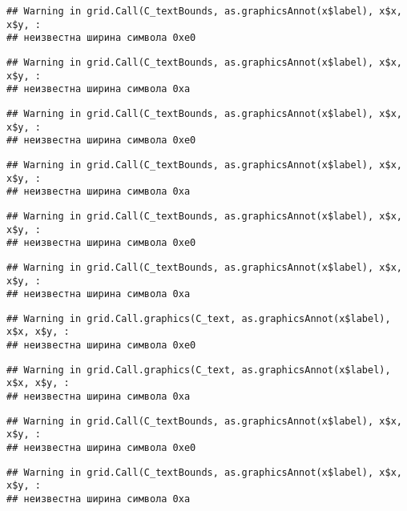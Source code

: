 \documentclass[
]{article}
\begin{document}
\begin{verbatim}
## Warning in grid.Call(C_textBounds, as.graphicsAnnot(x$label), x$x, x$y, :
## неизвестна ширина символа 0xe0
\end{verbatim}

\begin{verbatim}
## Warning in grid.Call(C_textBounds, as.graphicsAnnot(x$label), x$x, x$y, :
## неизвестна ширина символа 0xa
\end{verbatim}

\begin{verbatim}
## Warning in grid.Call(C_textBounds, as.graphicsAnnot(x$label), x$x, x$y, :
## неизвестна ширина символа 0xe0
\end{verbatim}

\begin{verbatim}
## Warning in grid.Call(C_textBounds, as.graphicsAnnot(x$label), x$x, x$y, :
## неизвестна ширина символа 0xa
\end{verbatim}

\begin{verbatim}
## Warning in grid.Call(C_textBounds, as.graphicsAnnot(x$label), x$x, x$y, :
## неизвестна ширина символа 0xe0
\end{verbatim}

\begin{verbatim}
## Warning in grid.Call(C_textBounds, as.graphicsAnnot(x$label), x$x, x$y, :
## неизвестна ширина символа 0xa
\end{verbatim}

\begin{verbatim}
## Warning in grid.Call.graphics(C_text, as.graphicsAnnot(x$label), x$x, x$y, :
## неизвестна ширина символа 0xe0
\end{verbatim}

\begin{verbatim}
## Warning in grid.Call.graphics(C_text, as.graphicsAnnot(x$label), x$x, x$y, :
## неизвестна ширина символа 0xa
\end{verbatim}

\begin{verbatim}
## Warning in grid.Call(C_textBounds, as.graphicsAnnot(x$label), x$x, x$y, :
## неизвестна ширина символа 0xe0
\end{verbatim}

\begin{verbatim}
## Warning in grid.Call(C_textBounds, as.graphicsAnnot(x$label), x$x, x$y, :
## неизвестна ширина символа 0xa
\end{verbatim}
\end{document}
